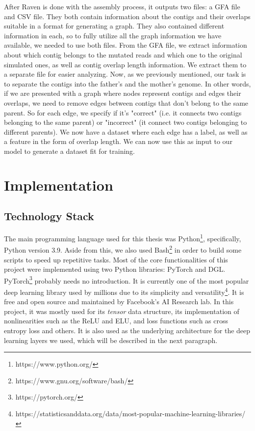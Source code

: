 \documentclass[times, utf8, diplomski, english]{fer_eng}
\begin{document}
After Raven is done with the assembly process, it outputs two files: a GFA file and CSV file. They both contain information about the contigs and their overlaps suitable in a format for generating a graph. They also contained different information in each, so to fully utilize all the graph information we have available, we needed to use both files. From the GFA file, we extract information about which contig belongs to the mutated reads and which one to the original simulated ones, as well as contig overlap length information. We extract them to a separate file for easier analyzing. Now, as we previously mentioned, our task is to separate the contigs into the father's and the mother's genome. In other words, if we are presented with a graph where nodes represent contigs and edges their overlaps, we need to remove edges between contigs that don't belong to the same parent. So for each edge, we specify if it's "correct" (i.e. it connects two contigs belonging to the same parent) or "incorrect" (it connect two contigs belonging to different parents). We now have a dataset where each edge has a label, as well as a feature in the form of overlap length. We can now use this as input to our model to generate a dataset fit for training.

\chapter{Implementation}

\section{Technology Stack}

The main programming language used for this thesis was Python\footnote{https://www.python.org/}, specifically, Python version 3.9. Aside from this, we also used Bash\footnote{https://www.gnu.org/software/bash/} in order to build some scripts to speed up repetitive tasks. Most of the core functionalities of this project were implemented using two Python libraries: PyTorch and DGL. PyTorch\footnote{https://pytorch.org/} probably needs no introduction. It is currently one of the most popular deep learning library used by millions due to its simplicity and versatility\footnote{https://statisticsanddata.org/data/most-popular-machine-learning-libraries/}. It is free and open source and maintained by Facebook's AI Research lab. In this project, it was mostly used for its \textit{tensor} data structure, its implementation of nonlinearities such as the ReLU and ELU, and loss functions such as cross entropy loss and others. It is also used as the underlying architecture for the deep learning layers we used, which will be described in the next paragraph.
\end{document}
